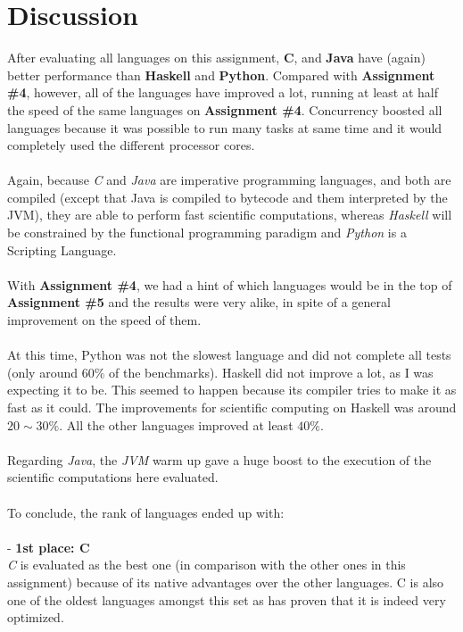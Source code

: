 \documentclass[conference]{IEEEtran}
\begin{document}
\section{Discussion}
After evaluating all languages on this assignment, \textbf{C}, and \textbf{Java} have (again) better performance than \textbf{Haskell} and \textbf{Python}. Compared with \textbf{Assignment \#4}, however, all of the languages have improved a lot, running at least at half the speed of the same languages on \textbf{Assignment \#4}. Concurrency boosted all languages because it was possible to run many tasks at same time and it would completely used the different processor cores.
\\\\
Again, because \textit{C} and \textit{Java} are imperative programming languages, and both are compiled (except that Java is compiled to bytecode and them interpreted by the JVM), they are able to perform fast scientific computations, whereas \textit{Haskell} will be constrained by the functional programming paradigm and \textit{Python} is a Scripting Language.
\\\\
With \textbf{Assignment \#4}, we had a hint of which languages would be in the top of \textbf{Assignment \#5} and the results were very alike, in spite of a general improvement on the speed of them.
\\\\
At this time, Python was not the slowest language and did not complete all tests (only around 60\% of the benchmarks). Haskell did not improve a lot, as I was expecting it to be. This seemed to happen because its compiler tries to make it as fast as it could. The improvements for scientific computing on Haskell was around $20\sim30\%$. All the other languages improved at least $40\%$.
\\\\
Regarding \textit{Java}, the \textit{JVM} warm up gave a huge boost to the execution of the scientific computations here evaluated.
\\\\
To conclude, the rank of languages ended up with:
\\\\
- \textbf{1st place: C}\\
\textit{C} is evaluated as the best one (in comparison with the other ones in this assignment) because of its native advantages over the other languages. C is also one of the oldest languages amongst this set as has proven that it is indeed very optimized.
\end{document}
